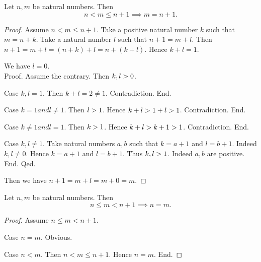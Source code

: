 \documentclass[../arithmetic.tex]{subfiles}
\begin{document}
  \begin{forthel}
    \begin{proposition}
      Let $n, m$ be natural numbers.
      Then \[ n \less m \leq n \plus 1 \implies m = n \plus 1. \]
    \end{proposition}
    \begin{proof}
      Assume $n \less m \leq n \plus 1$.
      Take a positive natural number $k$ such that $m = n \plus k$.
      Take a natural number $l$ such that $n \plus 1 = m \plus l$.
      Then $n \plus 1
        = m \plus l
        = (n \plus k) \plus l
        = n \plus (k \plus l)$.
      Hence $k \plus l = 1$.

      We have $l = 0$. \\
      Proof.
        Assume the contrary.
        Then $k,l > 0$.

        Case $k,l = 1$.
          Then $k \plus l
            = 2
            \neq 1$.
          Contradiction.
        End.

        Case $k = 1 and l \neq 1$.
          Then $l > 1$.
          Hence $k + l
            > 1 + l
            > 1$.
          Contradiction.
        End.

        Case $k \neq 1 and l = 1$.
          Then $k > 1$.
          Hence $k + l
            > k + 1
            > 1$.
          Contradiction.
        End.

        Case $k, l \neq 1$.
          Take natural numbers $a, b$ such that $k = a \plus 1$ and $l = b \plus 1$.
          Indeed $k, l \neq 0$.
          Hence $k = a \plus 1$ and $l = b \plus 1$.
          Thus $k, l > 1$. Indeed $a, b$ are positive.
        End.
      Qed.

      Then we have $n \plus 1
        = m \plus l
        = m \plus 0
        = m$.
    \end{proof}
  \end{forthel}

  \begin{forthel}
    \begin{proposition}
      Let $n, m$ be natural numbers.
      Then \[ n \leq m \less n \plus 1 \implies n = m. \]
    \end{proposition}
    \begin{proof}
      Assume $n \leq m \less n \plus 1$.

      Case $n = m$. Obvious.

      Case $n \less m$.
        Then $n \less m \leq n \plus 1$.
        Hence $n = m$.
      End.
    \end{proof}
  \end{forthel}
\end{document}
